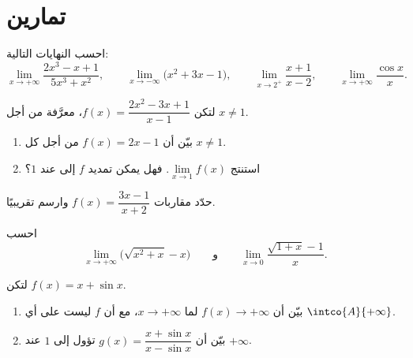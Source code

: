 \section{تمارين}

\begin{exercise}[$\star$]\label{exo:g12:limcont:1}
احسب النهايات التالية:
\[
\lim_{x\to+\infty} \frac{2x^3 - x + 1}{5x^3 + x^2}, \qquad
\lim_{x\to-\infty} \bigl(x^2 + 3x - 1\bigr), \qquad
\lim_{x\to 2^+} \frac{x+1}{x-2}, \qquad
\lim_{x\to+\infty} \frac{\cos x}{x}.
\]
\end{exercise}

\begin{exercise}[$\star$]\label{exo:g12:limcont:2}
لتكن $f(x) = \dfrac{2x^2 - 3x + 1}{x - 1}$، معرَّفة من أجل $x \neq 1$.
\begin{enumerate}
  \item بيّن أن $f(x) = 2x - 1$ من أجل كل $x \neq 1$.
  \item استنتج $\lim\limits_{x \to 1} f(x)$. فهل يمكن تمديد $f$ إلى
         عند $1$؟
\end{enumerate}
\end{exercise}

\begin{exercise}[$\star$]\label{exo:g12:limcont:3}
حدّد مقاربات  
$f(x) = \dfrac{3x - 1}{x + 2}$ وارسم  تقريبيًا.
\end{exercise}

\begin{exercise}[$\star\star$]\label{exo:g12:limcont:4}
احسب
\[
\lim_{x\to+\infty} \bigl(\sqrt{x^2 + x} - x\bigr)
\qquad\text{و}\qquad
\lim_{x\to 0} \frac{\sqrt{1+x} - 1}{x}.
\]
\end{exercise}

\begin{exercise}[$\star\star$]\label{exo:g12:limcont:5}
لتكن $f(x) = x + \sin x$.
\begin{enumerate}
  \item بيّن أن $f(x) \to +\infty$ لما $x \to +\infty$، مع أن $f$ ليست
         على أي  $\intco{A}{+\infty}$.
  \item بيّن أن $g(x) = \dfrac{x + \sin x}{x - \sin x}$ تؤول إلى $1$ عند
        $+\infty$.
\end{enumerate}
\end{exercise}

